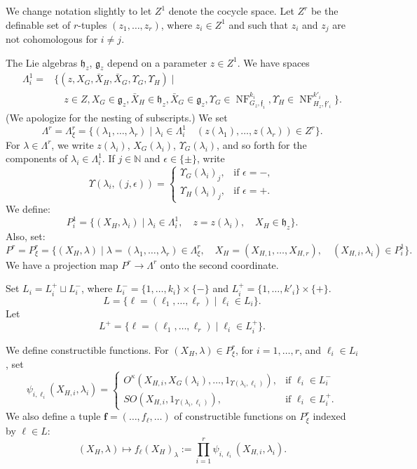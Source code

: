 \documentclass[12pt]{amsart}
\newcommand{\op}[1]{\operatorname{#1}}
\newcommand{\ring}[1]{{\mathbb #1}}
\def\NF{\op{NF}}
\def\Y{\Upsilon}
\def\s{{\mathfrak{f}}}
\def\bf{\mathbf f}
\newcommand{\fg}{\mathfrak{g}}
\newcommand{\fh}{\mathfrak{h}}
\theoremstyle{plain}
\theoremstyle{definition}
\begin{document}
We change notation slightly to let $Z^1$ denote the
cocycle space.  Let $Z^r$ be the definable
set of $r$-tuples $(z_1,\ldots,z_r)$, where $z_i \in Z^1$ and such
that $z_i$ and $z_j$ are not cohomologous for $i\ne j$.  

The Lie algebras $\fh_z$, $\fg_z$ depend on a parameter $z\in Z^1$.
We have spaces
\begin{align*}
\Lambda^1_i = &\{(z,X_G,\bar X_H,\bar X_G,\Y_G,\Y_H) \mid \\
     &\quad z\in Z, X_G\in \fg_z,
\bar X_H \in \fh_z, \bar X_G\in \fg_z, \Y_G\in \NF^{k_i}_{G_z,\s_i}, \Y_H\in \NF^{k'_i}_{H_z,\s'_i}\}.
\end{align*}
(We apologize for the nesting of subscripts.)
We set
\[
\Lambda^r = \Lambda^r_\xi = \{(\lambda_1,\ldots,\lambda_r) \mid \lambda_i \in \Lambda^1_i\quad
  (z(\lambda_1),\ldots,z(\lambda_r))\in Z^r \}.
\]
For $\lambda\in \Lambda^r$, we write
$z(\lambda_i)$, $X_G(\lambda_i)$, $\Y_G(\lambda_i)$, and so forth for the components of $\lambda_i\in\Lambda^1_i$.  
If $j\in\ring{N}$ and $\epsilon\in\{\pm\}$, write
\[
\Y(\lambda_i,(j,\epsilon)) = 
\begin{cases}
\Y_G(\lambda_i)_j,&\text{if }\epsilon= -,\\
\Y_H(\lambda_i)_j,&\text{if }\epsilon= +.
\end{cases}
\]
We
define:
\[
P^1_i = \{(X_H,\lambda_i) \mid \lambda_i\in \Lambda^1_i,
\quad z = z(\lambda_i),\quad X_H \in \fh_z\}.
\]
Also, set:
\[
P^r = P^r_\xi = \{(X_H,\lambda) \mid \lambda = (\lambda_1,\ldots,\lambda_r)\in \Lambda^r_\xi,\quad
  X_H = (X_{H,1},\ldots,X_{H,r}), \quad (X_{H,i},\lambda_i) \in P^1_i\}.
\]
We have a projection map $P^r\to \Lambda^r$ onto the second coordinate.

Set
$L_i = L^+_i\sqcup L^-_i$, where $L^-_i =
\{1,\ldots,k_i\}\times\{-\}$ and $L^+_i =
\{1,\ldots,k'_i\}\times\{+\}$.
\[
L = \{\ell = (\ell_1,\ldots,\ell_r)\mid \ell_i\in L_i\}.
\]
Let
\[
L^+ = \{\ell = (\ell_1,\ldots,\ell_r)\mid \ell_i\in L^+_i\}.
\]

We define constructible functions.  For $(X_H,\lambda)\in
P^r_\xi$,  for $i=1,\ldots,r$, and $\ell_i\in L_i$,
set
\begin{equation}\label{eqn:psi}
\psi_{i,\ell_i}(X_{H,i},\lambda_i) = 
\begin{cases}   
  O^\kappa(X_{H,i},X_G(\lambda_i),\ldots,1_{\Y(\lambda_i,\ell_i)}),
   & \text{if } \ell_i\in L^-_i \\
  SO(X_{H,i},1_{\Y(\lambda_i,\ell_i)}),
   & \text{if } \ell_i\in L^+_i.
\end{cases}
\end{equation}
 We also define a tuple $\bf=(\ldots,f_\ell,\ldots)$ of constructible functions
on $P^r_\xi$ indexed by $\ell\in L$:
\[
(X_H,\lambda)\mapsto f_\ell(X_H)_\lambda := \prod_{i=1}^r \psi_{i,\ell_i}(X_{H,i},\lambda_i).
\]
\end{document}

